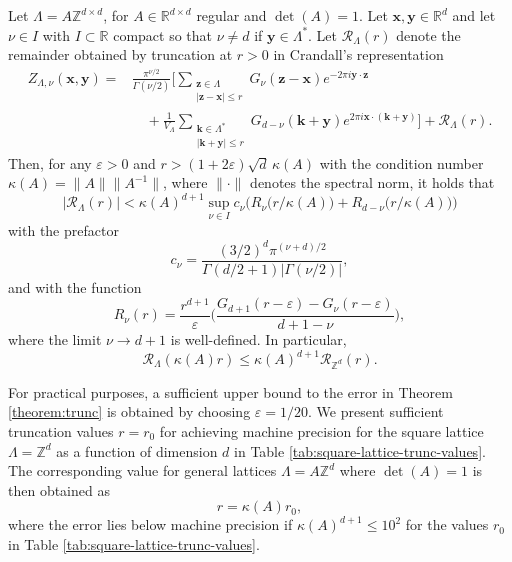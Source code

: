 \documentclass[]{amsart}
\newcommand{\new}[1]{#1}
\newcommand{\zeps}[3]{\new{Z_{#1} (#2, #3)}}
\numberwithin{mythm}{section}
\begin{document}
\begin{theorem}
  \label{theorem:trunc}
Let $\Lambda=A\mathds Z^{d\times d}$, for $A\in\mathds R^{d\times d}$ regular and $\det(A)=1$. Let $\bm x, \bm y \in \mathds{R}^d$ and let
$\nu\in I$ with $I\subset\mathds R$ compact so that $\nu\neq d$ if $\bm y\in\Lambda^*$.
Let $\mathcal{R}_{\Lambda}(r)$ denote the remainder obtained by truncation at $r>0$ in Crandall's representation
\begin{align*}
\zeps{\Lambda,\nu}{\bm{x}}{\bm{y}}
=&\frac{\pi ^{\nu/2}}{\Gamma(\nu/2)}\Bigg[\sum_{\substack{\bm z\in\Lambda\\ |\bm z - \bm x|\le r}}
G_{\nu}(\bm{z} -\bm x)e^{-2\pi i\bm{y}\cdot\bm{z}}
\\
&
\quad
+\frac{1}{V_{\Lambda}}
\sum_{\substack{\bm k\in\Lambda^{\ast}\\ |\bm k + \bm y|\le r}}G_{d-\nu}
(\bm{k} + \bm y) e^{2\pi i\bm{x}\cdot (\bm{k} + \bm y)}
\Bigg]+\mathcal R_\Lambda(r).
\end{align*}
Then, for any $\varepsilon>0$ and $r>(1+2\varepsilon)\sqrt{d}\,\kappa(A)$ with the condition number $\kappa(A)=\|A\|\|A^{-1}\|$, where $\|\cdot\|$ denotes the spectral norm,
it holds that
$$
|\mathcal R_\Lambda(r)|<\kappa(A)^{d+1} \sup_{\nu \in I}
c_\nu
\Big(
R_{\nu}\big(r/\kappa(A)\big)
+
R_{d-\nu}\big(r/\kappa(A)\big)
\bigg)
$$
with the prefactor \[c_\nu = \frac{(3/2)^d\pi^{(\nu+d)/2}}{\Gamma(d/2+1)|\Gamma(\nu/2)|},\]
and with the function
$$
R_{\nu}(r)
=\frac {r^{d+1}}\varepsilon
\Big(
\frac{G_{d+1}(r-\varepsilon) - 
G_{\nu}(r-\varepsilon)}{d+1-\nu}\Big),
$$
where the limit $\nu\to d+1$ is well-defined.
In particular, 
\[
\mathcal R_\Lambda(\kappa(A)r)
\le \kappa(A)^{d+1}
\mathcal R_{\mathds Z^d}(r).\]
\end{theorem}


For practical purposes, a sufficient upper bound to the error in 
Theorem \ref{theorem:trunc} is obtained by choosing
$\varepsilon=1/20$.
We present sufficient truncation values $r=r_0$ for achieving machine precision for the square lattice $\Lambda=\mathds Z^d$ as a function of dimension $d$ in 
Table \ref{tab:square-lattice-trunc-values}.
The corresponding value for general lattices $\Lambda=A\mathds Z^d$ 
where $\det(A)=1$ 
is then obtained as
\[
r= \kappa(A) r_0,
\]
where the error lies below machine precision
if $\kappa(A)^{d+1}\le 10^2$
for the values $r_0$ in  
Table \ref{tab:square-lattice-trunc-values}.
\end{document}
